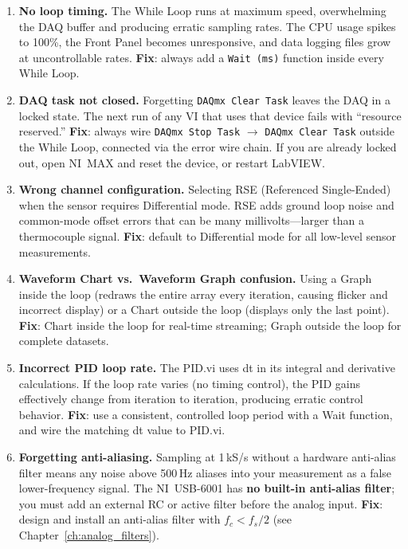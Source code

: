 \begin{enumerate}[leftmargin=1.5em]
\item \textbf{No loop timing.} The While Loop runs at maximum speed, overwhelming the DAQ buffer and producing erratic sampling rates. The CPU usage spikes to 100\%, the Front Panel becomes unresponsive, and data logging files grow at uncontrollable rates. \textbf{Fix}: always add a \texttt{Wait (ms)} function inside every While Loop.

\item \textbf{DAQ task not closed.} Forgetting \texttt{DAQmx Clear Task} leaves the DAQ in a locked state. The next run of any VI that uses that device fails with ``resource reserved.'' \textbf{Fix}: always wire \texttt{DAQmx Stop Task} $\to$ \texttt{DAQmx Clear Task} outside the While Loop, connected via the error wire chain. If you are already locked out, open NI~MAX and reset the device, or restart LabVIEW.

\item \textbf{Wrong channel configuration.} Selecting RSE (Referenced Single-Ended) when the sensor requires Differential mode. RSE adds ground loop noise and common-mode offset errors that can be many millivolts---larger than a thermocouple signal. \textbf{Fix}: default to Differential mode for all low-level sensor measurements.

\item \textbf{Waveform Chart vs.\ Waveform Graph confusion.} Using a Graph inside the loop (redraws the entire array every iteration, causing flicker and incorrect display) or a Chart outside the loop (displays only the last point). \textbf{Fix}: Chart inside the loop for real-time streaming; Graph outside the loop for complete datasets.

\item \textbf{Incorrect PID loop rate.} The PID.vi uses dt in its integral and derivative calculations. If the loop rate varies (no timing control), the PID gains effectively change from iteration to iteration, producing erratic control behavior. \textbf{Fix}: use a consistent, controlled loop period with a Wait function, and wire the matching dt value to PID.vi.

\item \textbf{Forgetting anti-aliasing.} Sampling at 1\,kS/s without a hardware anti-alias filter means any noise above 500\,Hz aliases into your measurement as a false lower-frequency signal. The NI~USB-6001 has \textbf{no built-in anti-alias filter}; you must add an external RC or active filter before the analog input. \textbf{Fix}: design and install an anti-alias filter with $f_c < f_s/2$ (see Chapter~\ref{ch:analog_filters}).
\end{enumerate}

